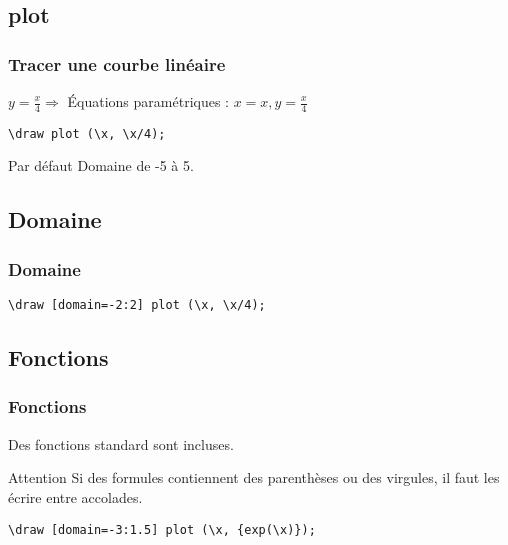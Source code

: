 \documentclass{clic_latex_beamer}
\begin{document}
\subsection{plot}
\begin{frame}[fragile]
\frametitle{Tracer une courbe linéaire}
$y=\frac{x}{4} \Rightarrow$ Équations paramétriques : $ x=x, y=\frac{x}{4}$

\pause

\begin{lstlisting}
\draw plot (\x, \x/4);
\end{lstlisting}

\pause


\pause

\begin{block}{Par défaut}
 Domaine de -5 à 5.
\end{block}

\end{frame}

\subsection{Domaine}
\begin{frame}[fragile]
\frametitle{Domaine}

\begin{lstlisting}
\draw [domain=-2:2] plot (\x, \x/4);
\end{lstlisting}


\end{frame}

\subsection{Fonctions}
\begin{frame}[fragile]
\frametitle{Fonctions}

Des fonctions standard sont incluses.

\begin{alertblock}{Attention}
 Si des formules contiennent des parenthèses ou des virgules, il faut les écrire entre accolades.\end{alertblock}

\begin{lstlisting}
\draw [domain=-3:1.5] plot (\x, {exp(\x)});
\end{lstlisting}


\end{frame}
\end{document}
